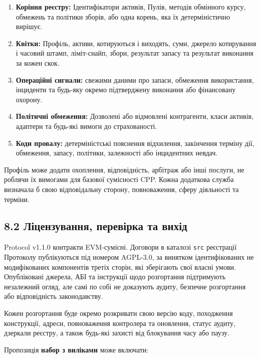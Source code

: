 \documentclass[11pt]{article}
\begin{document}
\begin{enumerate}[leftmargin=*]
\item \textbf{Коріння реєстру:} Ідентифікатори активів, Пулів, методів обмінного курсу, обмежень та політики зборів, або одна корень, яка їх детерміністично вирішує.
\item \textbf{Квітки:} Профіль, активи, котируються і виходять, суми, джерело котирування і часовий штамп, ліміт-снайп, збори, результат запасу та результат виконання за кожен скок.
\item \textbf{Операційні сигнали:} свежими даними про запаси, обмеження використання, інциденти та будь-яку окремо підтверджену виконання або фінансовану охорону.
\item \textbf{Політичні обмеження:} Дозволені або відмовлені контрагенти, класи активів, адаптери та будь-які вимоги до страхованості.
\item \textbf{Коди провалу:} детерміністські пояснення відхилення, закінчення терміну дії, обмеження, запасу, політики, залежності або інцидентних невдач.
\end{enumerate}
Профіль може додати охоплення, відповідність, арбітраж або інші послуги, не роблячи їх вимогами для базової сумісності CPP. Кожна додаткова служба визначала б свою відповідальну сторону, повноваження, сферу діяльності та терміни.

\subsection*{8.2 Ліцензування, перевірка та вихід}

Protocol v1.1.0 контракти EVM-сумісні. Договори в каталозі \texttt{src} реєстрації Протоколу публікуються під номером AGPL-3.0, за винятком ідентифікованих не модифікованих компонентів третіх сторін, які зберігають свої власні умови. Опубліковані джерела, АБІ та інструкції щодо розгортання підтримують незалежний огляд, але самі по собі не доказують аудиту, безпечне розгортання або відповідність законодавству.

Кожен розгортання буде окремо розкривати свою версію коду, походження конструкції, адреси, повноваження контролера та оновлення, статус аудиту, дзеркали реєстру, а також будь-які захисті від блокування часу або паузу.

Пропозиція \textbf{набор з виліками} може включати:
\end{document}
